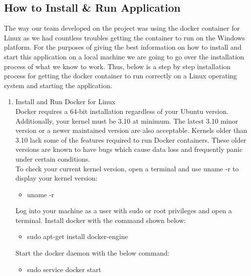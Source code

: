 \documentclass[draftclsnofoot,10pt,onecolumn]{IEEEtran} %
\begin{document}
\subsection{How to Install \& Run Application}

The way our team developed on the project was using the docker container for Linux as we had countless troubles getting the container to run on the Windows platform. For the purposes of giving the best information on how to install and start this application on a local machine we are going to go over the installation process of what we know to work. Thus, below is a step by step installation process for getting the docker container to run correctly on a Linux operating system and starting the application. \\

\begin{enumerate}
	\item Install and Run Docker for Linux \\
	Docker requires a 64-bit installation regardless of your Ubuntu version. Additionally, your kernel must be 3.10 at minimum. 
	The latest 3.10 minor version or a newer maintained version are also acceptable. Kernels older than 3.10 lack some of the 
	features required to run Docker containers. These older versions are known to have bugs which cause data loss and frequently 
	panic under certain conditions.\\
	
	To check your current kernel version, open a terminal and use uname -r to display your kernel version:
	
	\begin{itemize}
		\item uname -r \\
	\end{itemize}
	
	Log into your machine as a user with sudo or root privileges and open a terminal. Install docker with the command shown below:
	
	\begin{itemize}
		\item sudo apt-get install docker-engine \\
	\end{itemize}
	
	Start the docker daemon with the below command:
	
	\begin{itemize}
		\item sudo service docker start \\
	\end{itemize}
	

\end{enumerate}
\end{document}
